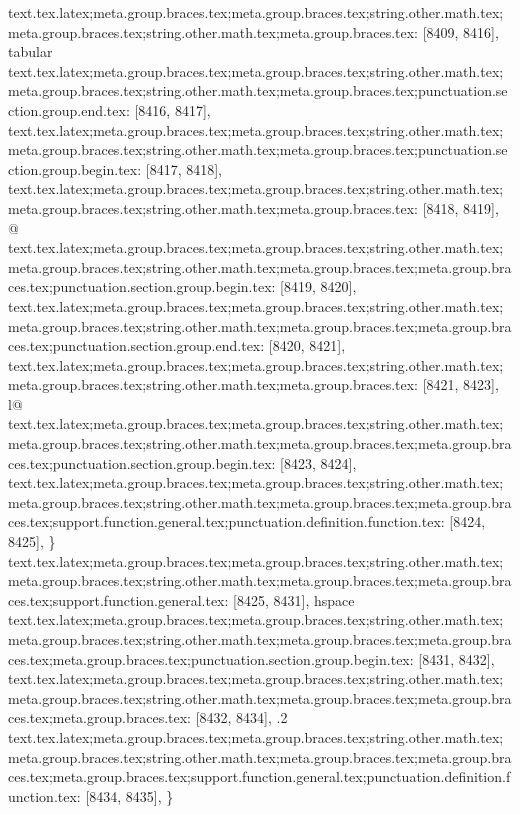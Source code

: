 {{{{{{{{{{{{{{{{{{{{{{{{{{{{{{{{{{{{{{{{{{{{{{{{{{{{{{{{{{{{{{{{{{{{{{{{{{{{{{{{{{{{{{{{{{{{{{{{{{{{{{{{{{{{{{{{{{{{{{{{{{{{{{{{{{{{{{{{{{{{{{{{{{{{{{{{{{{{{{{{{{{{{{{{{{{{{{{{{{{{{{{{{{{{{{{{{{{{{{{{{{{{{{{{{{{{{{{{{{{{{{{{{{{{{{{{{{{{{{{{{{{{{text.tex.latex;meta.group.braces.tex;meta.group.braces.tex;string.other.math.tex;meta.group.braces.tex;string.other.math.tex;meta.group.braces.tex: [8409, 8416], {tabular}
text.tex.latex;meta.group.braces.tex;meta.group.braces.tex;string.other.math.tex;meta.group.braces.tex;string.other.math.tex;meta.group.braces.tex;punctuation.section.group.end.tex: [8416, 8417], {}}
text.tex.latex;meta.group.braces.tex;meta.group.braces.tex;string.other.math.tex;meta.group.braces.tex;string.other.math.tex;meta.group.braces.tex;punctuation.section.group.begin.tex: [8417, 8418], {{}
text.tex.latex;meta.group.braces.tex;meta.group.braces.tex;string.other.math.tex;meta.group.braces.tex;string.other.math.tex;meta.group.braces.tex: [8418, 8419], {@}
text.tex.latex;meta.group.braces.tex;meta.group.braces.tex;string.other.math.tex;meta.group.braces.tex;string.other.math.tex;meta.group.braces.tex;meta.group.braces.tex;punctuation.section.group.begin.tex: [8419, 8420], {{}
text.tex.latex;meta.group.braces.tex;meta.group.braces.tex;string.other.math.tex;meta.group.braces.tex;string.other.math.tex;meta.group.braces.tex;meta.group.braces.tex;punctuation.section.group.end.tex: [8420, 8421], {}}
text.tex.latex;meta.group.braces.tex;meta.group.braces.tex;string.other.math.tex;meta.group.braces.tex;string.other.math.tex;meta.group.braces.tex: [8421, 8423], {l@}
text.tex.latex;meta.group.braces.tex;meta.group.braces.tex;string.other.math.tex;meta.group.braces.tex;string.other.math.tex;meta.group.braces.tex;meta.group.braces.tex;punctuation.section.group.begin.tex: [8423, 8424], {{}
text.tex.latex;meta.group.braces.tex;meta.group.braces.tex;string.other.math.tex;meta.group.braces.tex;string.other.math.tex;meta.group.braces.tex;meta.group.braces.tex;support.function.general.tex;punctuation.definition.function.tex: [8424, 8425], {\}
text.tex.latex;meta.group.braces.tex;meta.group.braces.tex;string.other.math.tex;meta.group.braces.tex;string.other.math.tex;meta.group.braces.tex;meta.group.braces.tex;support.function.general.tex: [8425, 8431], {hspace}
text.tex.latex;meta.group.braces.tex;meta.group.braces.tex;string.other.math.tex;meta.group.braces.tex;string.other.math.tex;meta.group.braces.tex;meta.group.braces.tex;meta.group.braces.tex;punctuation.section.group.begin.tex: [8431, 8432], {{}
text.tex.latex;meta.group.braces.tex;meta.group.braces.tex;string.other.math.tex;meta.group.braces.tex;string.other.math.tex;meta.group.braces.tex;meta.group.braces.tex;meta.group.braces.tex: [8432, 8434], {.2}
text.tex.latex;meta.group.braces.tex;meta.group.braces.tex;string.other.math.tex;meta.group.braces.tex;string.other.math.tex;meta.group.braces.tex;meta.group.braces.tex;meta.group.braces.tex;support.function.general.tex;punctuation.definition.function.tex: [8434, 8435], {\}
}}}}}}}}}}}}}}}}}}}}}}}}}}}}}}}}}}}}}}}}}}}}}}}}}}}}}}}}}}}}}}}}}}}}}}}}}}}}}}}}}}}}}}}}}}}}}}}}}}}}}}}}}}}}}}}}}}}}}}}}}}}}}}}}}}}}}}}}}}}}}}}}}}}}}}}}}}}}}}}}}}}}}}}}}}}}}}}}}}}}}}}}}}}}}}}}}}}}}}}}}}}}}}}}}}}}}}}}}}}}}}}}}}}}}}}}}}}}}}}}}}}}}}}}}

